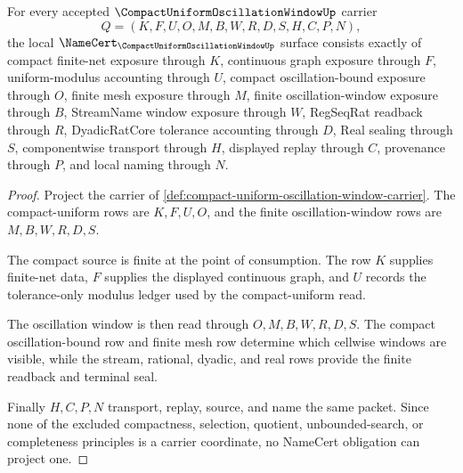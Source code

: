 \begin{theorem}
\label{thm:compact-uniform-oscillation-window-namecert-obligations}
For every accepted $\CompactUniformOscillationWindowUp$ carrier
$$
Q=(K,F,U,O,M,B,W,R,D,S,H,C,P,N),
$$
the local $\NameCert_{\CompactUniformOscillationWindowUp}$ surface consists exactly of compact finite-net exposure through $K$, continuous graph exposure through $F$, uniform-modulus accounting through $U$, compact oscillation-bound exposure through $O$, finite mesh exposure through $M$, finite oscillation-window exposure through $B$, StreamName window exposure through $W$, RegSeqRat readback through $R$, DyadicRatCore tolerance accounting through $D$, Real sealing through $S$, componentwise transport through $H$, displayed replay through $C$, provenance through $P$, and local naming through $N$.
\end{theorem}
\begin{proof}
Project the carrier of \autoref{def:compact-uniform-oscillation-window-carrier}. The compact-uniform rows are $K,F,U,O$, and the finite oscillation-window rows are $M,B,W,R,D,S$.

The compact source is finite at the point of consumption. The row $K$ supplies finite-net data, $F$ supplies the displayed continuous graph, and $U$ records the tolerance-only modulus ledger used by the compact-uniform read.

The oscillation window is then read through $O,M,B,W,R,D,S$. The compact oscillation-bound row and finite mesh row determine which cellwise windows are visible, while the stream, rational, dyadic, and real rows provide the finite readback and terminal seal.

Finally $H,C,P,N$ transport, replay, source, and name the same packet. Since none of the excluded compactness, selection, quotient, unbounded-search, or completeness principles is a carrier coordinate, no NameCert obligation can project one.
\end{proof}

